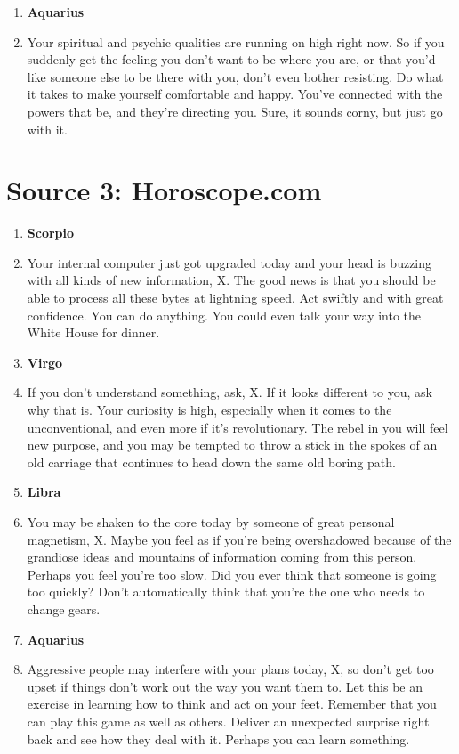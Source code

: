 \documentclass{article}[twocolumn]
\newcommand{\bb}[1]{\item[] \textbf{#1}}
\begin{document}
\begin{multicols}{2}
\begin{enumerate}
     \bb{Aquarius}\
    \item Your spiritual and psychic qualities are running on high right now. So if you suddenly get the feeling you don't want to be where you are, or that you'd like someone else to be there with you, don't even bother resisting. Do what it takes to make yourself comfortable and happy. You've connected with the powers that be, and they're directing you. Sure, it sounds corny, but just go with it.\\
\end{enumerate}
\section{Source 3: Horoscope.com
}

\begin{enumerate}
 \bb{Scorpio}
\item Your internal computer just got upgraded today and your head is buzzing with all kinds of new information, X. The good news is that you should be able to process all these bytes at lightning speed. Act swiftly and with great confidence. You can do anything. You could even talk your way into the White House for dinner.\\ 
 \bb{Virgo}
\item If you don't understand something, ask, X. If it looks different to you, ask why that is. Your curiosity is high, especially when it comes to the unconventional, and even more if it's revolutionary. The rebel in you will feel new purpose, and you may be tempted to throw a stick in the spokes of an old carriage that continues to head down the same old boring path.\\ 
 \bb{Libra}
\item You may be shaken to the core today by someone of great personal magnetism, X. Maybe you feel as if you're being overshadowed because of the grandiose ideas and mountains of information coming from this person. Perhaps you feel you're too slow. Did you ever think that someone is going too quickly? Don't automatically think that you're the one who needs to change gears.\\ 
 \bb{Aquarius}
\item Aggressive people may interfere with your plans today, X, so don't get too upset if things don't work out the way you want them to. Let this be an exercise in learning how to think and act on your feet. Remember that you can play this game as well as others. Deliver an unexpected surprise right back and see how they deal with it. Perhaps you can learn something.\\ 

\end{enumerate}
\end{multicols}
\end{document}
